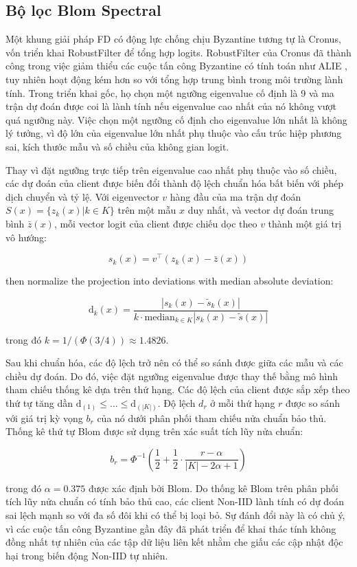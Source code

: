 \subsection{Bộ lọc Blom Spectral}
\label{sub:blom_spectral}

Một khung giải pháp FD có động lực chống chịu Byzantine tương tự là Cronus, vốn triển khai RobustFilter để tổng hợp logits. RobustFilter của Cronus đã thành công trong việc giảm thiểu các cuộc tấn công Byzantine có tính toán như ALIE \cite{baruch2019little}, tuy nhiên hoạt động kém hơn so với tổng hợp trung bình trong môi trường lành tính. Trong triển khai gốc, họ chọn một ngưỡng eigenvalue cố định là 9 và ma trận dự đoán được coi là lành tính nếu eigenvalue cao nhất của nó không vượt quá ngưỡng này. Việc chọn một ngưỡng cố định cho eigenvalue lớn nhất là không lý tưởng, vì độ lớn của eigenvalue lớn nhất phụ thuộc vào cấu trúc hiệp phương sai, kích thước mẫu và số chiều của không gian logit.

Thay vì đặt ngưỡng trực tiếp trên eigenvalue cao nhất phụ thuộc vào số chiều, các dự đoán của client được biến đổi thành độ lệch chuẩn hóa bất biến với phép dịch chuyển và tỷ lệ. Với eigenvector $v$ hàng đầu của ma trận dự đoán $S(x) = \{z_k(x)|k \in K\}$ trên một mẫu $x$ duy nhất, và vector dự đoán trung bình $\bar z(x)$, mỗi vector logit của client được chiếu dọc theo $v$ thành một giá trị vô hướng:

$$s_k(x) = v^\top(z_k(x) - \bar z(x))$$

then normalize the projection into deviations with median absolute deviation:

$$\mathrm{d}_k(x) = \frac{|s_k(x) - \tilde s_k(x)|}{k \cdot \text{median}_{k \in K}|s_k(x) - \tilde s(x)|}$$

trong đó $k=1/(\Phi(3/4)) \approx 1.4826$.

Sau khi chuẩn hóa, các độ lệch trở nên có thể so sánh được giữa các mẫu và các chiều dự đoán. Do đó, việc đặt ngưỡng eigenvalue được thay thế bằng mô hình tham chiếu thống kê dựa trên thứ hạng. Các độ lệch của client được sắp xếp theo thứ tự tăng dần $\mathrm{d}_{(1)} \leq \ldots \leq \mathrm{d}_{(|K|)}$. Độ lệch $d_{r}$ ở mỗi thứ hạng $r$ được so sánh với giá trị kỳ vọng $b_r$ của nó dưới phân phối tham chiếu nửa chuẩn bảo thủ. Thống kê thứ tự Blom \cite{blom} được sử dụng trên xác suất tích lũy nửa chuẩn:

$$b_r = \Phi^{-1}\left(\frac{1}{2} + \frac{1}{2} \cdot\frac{r-\alpha}{|K| - 2\alpha +1} \right)$$

trong đó $\alpha = 0.375$ được xác định bởi Blom. Do thống kê Blom trên phân phối tích lũy nửa chuẩn có tính bảo thủ cao, các client Non-IID lành tính có dự đoán sai lệch mạnh so với đa số đôi khi có thể bị loại bỏ. Sự đánh đổi này là có chủ ý, vì các cuộc tấn công Byzantine gần đây đã phát triển để khai thác tính không đồng nhất tự nhiên của các tập dữ liệu liên kết nhằm che giấu các cập nhật độc hại trong biến động Non-IID tự nhiên.

